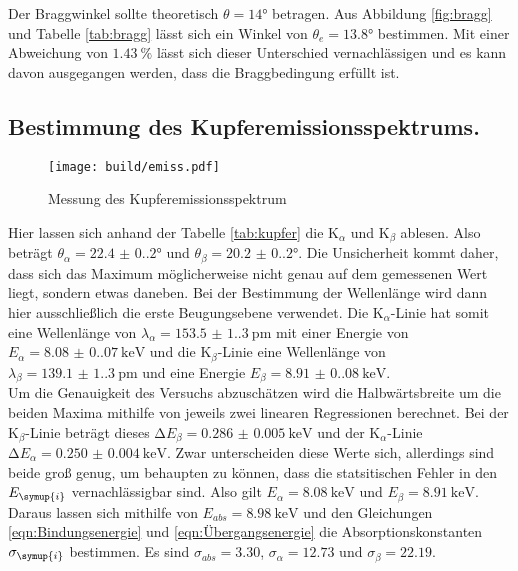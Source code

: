 Der Braggwinkel sollte theoretisch $\theta=14°$ betragen. Aus Abbildung \ref{fig:bragg} und Tabelle \ref{tab:bragg}
lässt sich ein Winkel von $\theta_e=13.8°$ bestimmen. Mit einer Abweichung von $\qty{1.43}{\percent}$ lässt sich dieser
Unterschied vernachlässigen und es kann davon ausgegangen werden, dass die Braggbedingung erfüllt ist.


\subsection{Bestimmung des Kupferemissionsspektrums.}

\begin{figure}[H]
  \centering
  \texttt{[image: build/emiss.pdf]}
  \caption{Messung des Kupferemissionsspektrum}
  \label{fig:kupfer}
\end{figure}



Hier lassen sich anhand der Tabelle \ref{tab:kupfer} die $\text{K}_{\alpha}$ und $\text{K}_{\beta}$ ablesen.
Also beträgt $\theta_{\alpha}=\qty{22.4(0.2)}°$ und $\theta_{\beta}=\qty{20.2(0.2)}°$. Die Unsicherheit kommt daher,
dass sich das Maximum möglicherweise nicht genau auf dem gemessenen Wert liegt, sondern etwas daneben. Bei der Bestimmung
der Wellenlänge wird dann hier ausschließlich die erste Beugungsebene verwendet. Die $\text{K}_{\alpha}$-Linie
hat somit eine Wellenlänge von $\lambda_{\alpha}=\qty{153.5(1.3)}{\pico\meter}$ mit einer Energie von 
$E_{\alpha}=\qty{8.08(0.07)}{\kilo\electronvolt}$ und die $\text{K}_{\beta}$-Linie eine Wellenlänge von
$\lambda_{\beta}=\qty{139.1(1.3)}{\pico\meter}$ und eine Energie $E_{\beta}=\qty{8.91(0.08)}{\kilo\electronvolt}$.\\
\noindent Um die Genauigkeit des Versuchs abzuschätzen wird die Halbwärtsbreite um die beiden Maxima mithilfe von jeweils
zwei linearen Regressionen berechnet. Bei der $\text{K}_{\beta}$-Linie beträgt dieses $\increment E_{\beta}=\qty{0.286(5)}{\kilo\electronvolt}$
und der  $\text{K}_{\alpha}$-Linie $\increment E_{\alpha}=\qty{0.250(4)}{\kilo\electronvolt}$. Zwar unterscheiden diese
Werte sich, allerdings sind beide groß genug, um behaupten zu können, dass die statsitischen Fehler in den $E_{\symup{i}}$
vernachlässigbar sind. Also gilt $E_{\alpha}=\qty{8.08}{\kilo\electronvolt}$ und $E_{\beta}=\qty{8.91}{\kilo\electronvolt}$.\\
\noindent Daraus lassen sich mithilfe von $E_{abs}=\qty{8.98}{\kilo\electronvolt}$ und den Gleichungen \ref{eqn:Bindungsenergie}
und \ref{eqn:Übergangsenergie} die Absorptionskonstanten $\sigma_{\symup{i}}$ bestimmen. Es sind $\sigma_{abs}=3.30$,
$\sigma_{\alpha}=12.73$ und $\sigma_{\beta}=22.19$.

